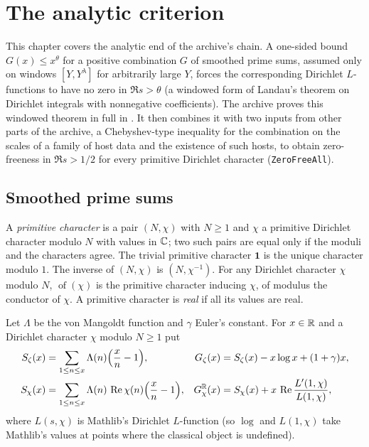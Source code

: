 \chapter{The analytic criterion}\label{ch:an}

This chapter covers the analytic end of the archive's chain. A one-sided
bound $G(x)\le x^{\theta}$ for a positive combination $G$ of smoothed prime
sums, assumed only on windows $[Y,Y^{\lambda}]$ for arbitrarily large $Y$,
forces the corresponding Dirichlet $L$-functions to have no zero in
$\Re s>\theta$ (a windowed form of Landau's theorem on Dirichlet integrals
with nonnegative coefficients). The archive proves this windowed theorem
in full in .
It then combines it with two inputs from other parts of the archive, a
Chebyshev-type inequality for the combination on the scales of a family of
host data and the existence of such hosts, to obtain zero-freeness in
$\Re s>1/2$ for every primitive Dirichlet character
(\texttt{ZeroFreeAll}).

\section{Smoothed prime sums}

\begin{definition}\label{an:pchar}
A \emph{primitive character} is a pair $(N,\chi)$ with $N\ge1$ and $\chi$ a
primitive Dirichlet character modulo $N$ with values in $\mathbb{C}$; two such
pairs are equal only if the moduli and the characters agree. The trivial
primitive character $\mathbf 1$ is the unique character modulo $1$. The
inverse of $(N,\chi)$ is $(N,\chi^{-1})$. For any Dirichlet character
$\chi$ modulo $N$, $\operatorname{of}(\chi)$ is the primitive character
inducing $\chi$, of modulus the conductor of $\chi$. A primitive character
is \emph{real} if all its values are real.
\end{definition}

\begin{definition}\label{an:smoothed}
Let $\Lambda$ be the von Mangoldt function and $\gamma$ Euler's constant.
For $x\in\mathbb{R}$ and a Dirichlet character $\chi$ modulo $N\ge1$ put
\begin{align*}
S_{\zeta}(x)&=\sum_{1\le n\le x}\Lambda(n)\Bigl(\frac xn-1\Bigr), &
G_{\zeta}(x)&=S_{\zeta}(x)-x\log x+(1+\gamma)x,\\
S_{\chi}(x)&=\sum_{1\le n\le x}\Lambda(n)\,\operatorname{Re}\chi(n)\Bigl(\frac xn-1\Bigr), &
G^{\mathbb{R}}_{\chi}(x)&=S_{\chi}(x)+x\,\operatorname{Re}\frac{L'(1,\chi)}{L(1,\chi)},
\end{align*}
where $L(s,\chi)$ is Mathlib's Dirichlet $L$-function (so $\log$ and
$L(1,\chi)$ take Mathlib's values at points where the classical object is
undefined).
\end{definition}

